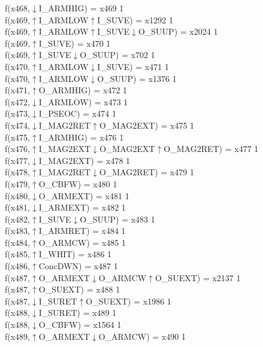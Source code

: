 f(x468,$\downarrow$I\_ARMHIG) = x469 {1} \\
f(x469,$\uparrow$I\_ARMLOW$\uparrow$I\_SUVE) = x1292 {1} \\
f(x469,$\uparrow$I\_ARMLOW$\uparrow$I\_SUVE$\downarrow$O\_SUUP) = x2024 {1} \\
f(x469,$\uparrow$I\_SUVE) = x470 {1} \\
f(x469,$\uparrow$I\_SUVE$\downarrow$O\_SUUP) = x702 {1} \\
f(x470,$\uparrow$I\_ARMLOW$\downarrow$I\_SUVE) = x471 {1} \\
f(x470,$\uparrow$I\_ARMLOW$\downarrow$O\_SUUP) = x1376 {1} \\
f(x471,$\uparrow$O\_ARMHIG) = x472 {1} \\
f(x472,$\downarrow$I\_ARMLOW) = x473 {1} \\
f(x473,$\downarrow$I\_PSEOC) = x474 {1} \\
f(x474,$\downarrow$I\_MAG2RET$\uparrow$O\_MAG2EXT) = x475 {1} \\
f(x475,$\uparrow$I\_ARMHIG) = x476 {1} \\
f(x476,$\uparrow$I\_MAG2EXT$\downarrow$O\_MAG2EXT$\uparrow$O\_MAG2RET) = x477 {1} \\
f(x477,$\downarrow$I\_MAG2EXT) = x478 {1} \\
f(x478,$\uparrow$I\_MAG2RET$\downarrow$O\_MAG2RET) = x479 {1} \\
f(x479,$\uparrow$O\_CBFW) = x480 {1} \\
f(x480,$\downarrow$O\_ARMEXT) = x481 {1} \\
f(x481,$\downarrow$I\_ARMEXT) = x482 {1} \\
f(x482,$\uparrow$I\_SUVE$\downarrow$O\_SUUP) = x483 {1} \\
f(x483,$\uparrow$I\_ARMRET) = x484 {1} \\
f(x484,$\uparrow$O\_ARMCW) = x485 {1} \\
f(x485,$\uparrow$I\_WHIT) = x486 {1} \\
f(x486,$\uparrow$ConcDWN) = x487 {1} \\
f(x487,$\uparrow$O\_ARMEXT$\downarrow$O\_ARMCW$\uparrow$O\_SUEXT) = x2137 {1} \\
f(x487,$\uparrow$O\_SUEXT) = x488 {1} \\
f(x487,$\downarrow$I\_SURET$\uparrow$O\_SUEXT) = x1986 {1} \\
f(x488,$\downarrow$I\_SURET) = x489 {1} \\
f(x488,$\downarrow$O\_CBFW) = x1564 {1} \\
f(x489,$\uparrow$O\_ARMEXT$\downarrow$O\_ARMCW) = x490 {1} \\
